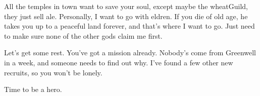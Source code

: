 \begin{multicols}{2}
\begin{exampletext}
  All the temples in town want to save your soul, except maybe the \gls{wheatGuild}, they just sell ale.
  Personally, I want to go with \gls{eldren}.
  If you die of old age, he takes you up to a peaceful land forever, and that's where I want to go.
  Just need to make sure none of the other gods claim me first.

  Let's get some rest.
  You've got a mission already.
  Nobody's come from Greenwell in a week, and someone needs to find out why.
  I've found a few other new recruits, so you won't be lonely.

  Time to be a hero.

\end{exampletext}

\end{multicols}
